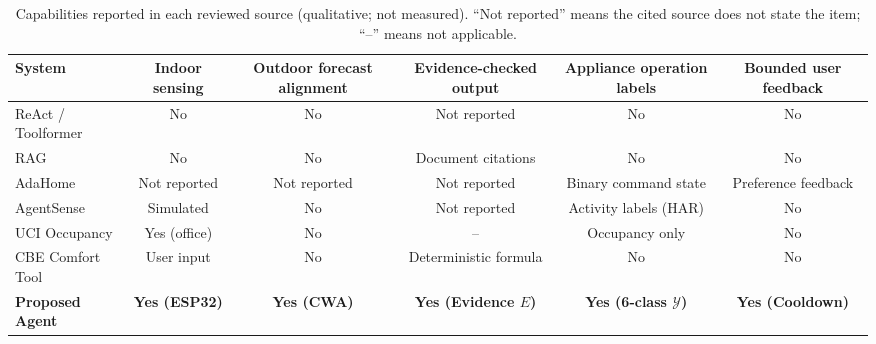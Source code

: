 \begin{table}[t]
\caption{Capabilities reported in each reviewed source (qualitative; not measured). ``Not reported'' means the cited source does not state the item; ``--'' means not applicable.}
\label{tab:comparison}
\centering
\footnotesize
\begin{tabular}{lccccc}
\toprule
System & Indoor sensing & Outdoor forecast alignment & Evidence-checked output & Appliance operation labels & Bounded user feedback \\
\midrule
ReAct / Toolformer \cite{yao2023react,schick2023toolformer} & No & No & Not reported & No & No \\
RAG \cite{lewis2020rag} & No & No & Document citations & No & No \\
AdaHome \cite{lim2026adahome} & Not reported & Not reported & Not reported & Binary command state & Preference feedback \\
AgentSense \cite{leng2025agentsense} & Simulated & No & Not reported & Activity labels (HAR) & No \\
UCI Occupancy \cite{candanedo2016occupancy} & Yes (office) & No & -- & Occupancy only & No \\
CBE Comfort Tool \cite{tartarini2020cbe} & User input & No & Deterministic formula & No & No \\
\textbf{Proposed Agent} & \textbf{Yes (ESP32)} & \textbf{Yes (CWA)} & \textbf{Yes (Evidence $E$)} & \textbf{Yes (6-class $\mathcal{Y}$)} & \textbf{Yes (Cooldown)} \\
\bottomrule
\end{tabular}
\end{table}
